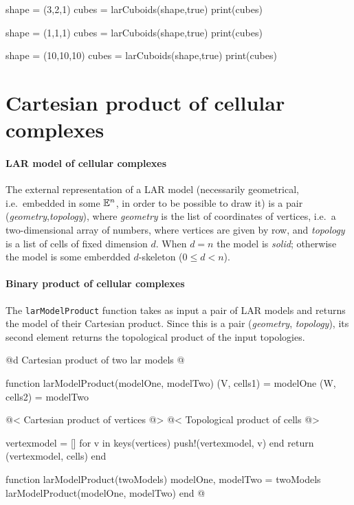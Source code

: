 shape = (3,2,1)
cubes = larCuboids(shape,true)
print(cubes)

shape = (1,1,1)
cubes = larCuboids(shape,true)
print(cubes)

shape = (10,10,10)
cubes = larCuboids(shape,true)
print(cubes)


\section{Cartesian product of cellular complexes} \label{sec:product}

\paragraph{LAR model of cellular complexes}

The external representation of a LAR model (necessarily geometrical, i.e.~embedded in some $\mathbb{E}^n$, in order to be possible to draw it) is a pair (\emph{geometry},\emph{topology}), where \emph{geometry} is the list of coordinates of vertices, i.e.~a two-dimensional array of numbers, where vertices are given by row, and \emph{topology} is a list of cells of fixed dimension $d$. When $d=n$ the model is \emph{solid}; otherwise  the model is some emberdded $d$-skeleton ($0\leq d <n$).

\paragraph{Binary product of cellular complexes}
The \texttt{larModelProduct} function takes as input a pair of LAR models and returns the model of their Cartesian product. Since this is a pair (\emph{geometry}, \emph{topology}), its second element returns the topological product of the input topologies.

@d Cartesian product of two lar models  
@{function larModelProduct(modelOne, modelTwo)
    (V, cells1) = modelOne
    (W, cells2) = modelTwo

    @< Cartesian product of vertices @>
    @< Topological product of cells    @>

    vertexmodel = []
    for v in keys(vertices)
        push!(vertexmodel, v)
    end
    return (vertexmodel, cells)
end

function larModelProduct(twoModels)
    modelOne, modelTwo = twoModels
    larModelProduct(modelOne, modelTwo)
end
@}

